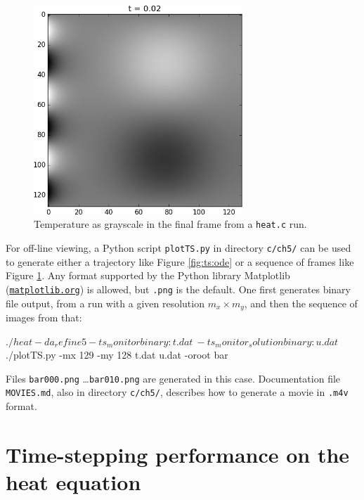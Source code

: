 \begin{figure}
\includegraphics[width=0.7\textwidth]{figs/heatfinaltime}
\caption{Temperature as grayscale in the final frame from a \texttt{heat.c} run.}
\label{fig:ts:heatfinaltime}
\end{figure}

For off-line viewing, a Python script \texttt{plotTS.py} in directory \texttt{c/ch5/} can be used to generate either a trajectory like Figure \ref{fig:ts:ode} or a sequence of frames like Figure \ref{fig:ts:heatfinaltime}.  Any format supported by the Python library Matplotlib (\href{http://matplotlib.org/}{\texttt{matplotlib.org}}) is allowed, but \texttt{.png} is the default.  One first generates \PETSc binary file output, from a run with a given resolution $m_x \times m_y$, and then the sequence of images from that:
\begin{cline}
$ ./heat -da_refine 5 -ts_monitor binary:t.dat \
    -ts_monitor_solution binary:u.dat
$ ./plotTS.py -mx 129 -my 128 t.dat u.dat -oroot bar
\end{cline}
Files \texttt{bar000.png} \dots \texttt{bar010.png} are generated in this case.  Documentation file \texttt{MOVIES.md}, also in directory \texttt{c/ch5/}, describes how to generate a movie in \texttt{.m4v} format.


\section{Time-stepping performance on the heat equation}

